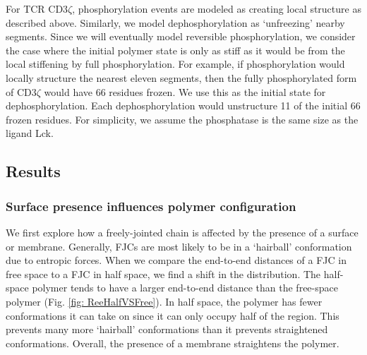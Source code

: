 \documentclass[../../AdvancementSummary.tex]{subfiles}
\begin{document}
For TCR CD3$\zeta$, phosphorylation events are modeled as creating local structure as described above. Similarly, we model dephosphorylation as `unfreezing' nearby segments. Since we will eventually model reversible phosphorylation, we consider the case where the initial polymer state is only as stiff as it would be from the local stiffening by full phosphorylation. For example, if phosphorylation would locally structure the nearest eleven segments, then the fully phosphorylated form of CD3$\zeta$ would have 66 residues frozen. We use this as the initial state for dephosphorylation. Each dephosphorylation would unstructure 11 of the initial 66 frozen residues. For simplicity, we assume the phosphatase is the same size as the ligand Lck.


\subsection{Results}

\subsubsection{Surface presence influences polymer configuration}
We first explore how a freely-jointed chain is affected by the presence of a surface or membrane. Generally, FJCs are most likely to be in a `hairball' conformation due to entropic forces. When we compare the end-to-end distances of a FJC in free space to a FJC in half space, we find a shift in the distribution. The half-space polymer tends to have a larger end-to-end distance than the free-space polymer (Fig. \ref{fig: ReeHalfVSFree}). In half space, the polymer has fewer conformations it can take on since it can only occupy half of the region. This prevents many more `hairball' conformations than it prevents straightened conformations. Overall, the presence of a membrane straightens the polymer. 
\end{document}
